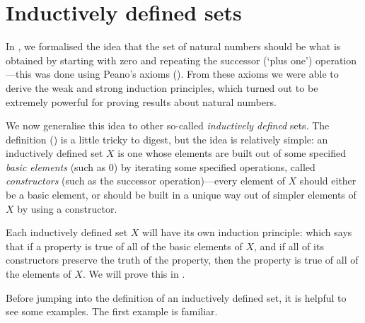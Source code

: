 \section{Inductively defined sets}
\label{secStructuralInduction}

In , we formalised the idea that the set of natural numbers should be what is obtained by starting with zero and repeating the successor (`plus one') operation---this was done using Peano's axioms (). From these axioms we were able to derive the weak and strong induction principles, which turned out to be extremely powerful for proving results about natural numbers.

We now generalise this idea to other so-called \textit{inductively defined} sets. The definition () is a little tricky to digest, but the idea is relatively simple: an inductively defined set $X$ is one whose elements are built out of some specified \textit{basic elements} (such as $0$) by iterating some specified operations, called \textit{constructors} (such as the successor operation)---every element of $X$ should either be a basic element, or should be built in a unique way out of simpler elements of $X$ by using a constructor.

Each inductively defined set $X$ will have its own induction principle: which says that if a property is true of all of the basic elements of $X$, and if all of its constructors preserve the truth of the property, then the property is true of all of the elements of $X$. We will prove this in .

Before jumping into the definition of an inductively defined set, it is helpful to see some examples. The first example is familiar.

